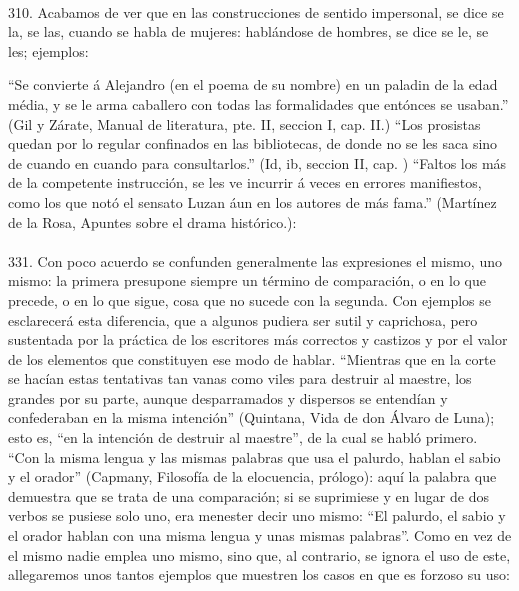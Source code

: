 \documentclass{book}
\begin{document}
\paragraph{} 310. Acabamos de ver que en las construcciones de sentido impersonal, se dice se la, se las, cuando 
se habla de mujeres: hablándose de hombres, se dice se le, se les; ejemplos:

“Se convierte á Alejandro (en el poema de su nombre) en un paladin de la edad média, y se le arma caballero con 
todas las formalidades que entónces se usaban.” (Gil y Zárate, Manual de literatura, pte. II, seccion I, cap. 
II.) “Los prosistas quedan por lo regular confinados en las bibliotecas, de donde no se les saca sino de cuando 
en cuando para consultarlos.” (Id, ib, seccion II, cap. ) “Faltos los más de la competente instrucción, se les 
ve incurrir á veces en errores manifiestos, como los que notó el sensato Luzan áun en los autores de más fama.” 
(Martínez de la Rosa, Apuntes sobre el drama histórico.): 

\paragraph{} 331. Con poco acuerdo se confunden generalmente las expresiones el mismo, uno mismo: la primera 
presupone siempre un término de comparación, o en lo que precede, o en lo que sigue, cosa que no sucede con la 
segunda. Con ejemplos se esclarecerá esta diferencia, que a algunos pudiera ser sutil y caprichosa, pero 
sustentada por la práctica de los escritores más correctos y castizos y por el valor de los elementos que 
constituyen ese modo de hablar.
“Mientras que en la corte se hacían estas tentativas tan vanas como viles para destruir al maestre, los grandes 
por su parte, aunque desparramados y dispersos se entendían y confederaban en la misma intención” (Quintana, 
Vida de don Álvaro de Luna); esto es, “en la intención de destruir al maestre”, de la cual se habló primero.
“Con la misma lengua y las mismas palabras que usa el palurdo, hablan el sabio y el orador” (Capmany, Filosofía 
de la elocuencia, prólogo): aquí la palabra que demuestra que se trata de una comparación; si se suprimiese y en 
lugar de dos verbos se pusiese solo uno, era menester decir uno mismo: “El palurdo, el sabio y el orador hablan 
con una misma lengua y unas mismas palabras”.
Como en vez de el mismo nadie emplea uno mismo, sino que, al contrario, se ignora el uso de este, allegaremos 
unos tantos ejemplos que muestren los casos en que es forzoso su uso:
\end{document}
